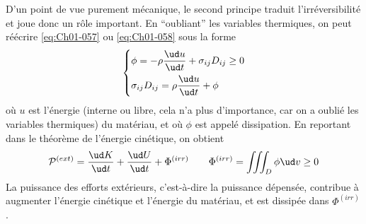 D'un point de vue purement mécanique, le second principe traduit l'irréversibilité et joue donc un rôle important.
En ``oubliant'' les variables thermiques, on peut réécrire \eqref{eq:Ch01-057} ou \eqref{eq:Ch01-058} sous la forme
\begin{equation}
    \left\{
    \begin{aligned}
        & \phi = -\rho \frac{\ud u}{\ud t} + \sigma_{ij} D_{ij} \geq 0\\
        & \sigma_{ij} D_{ij} = \rho \frac{\ud u}{\ud t} + \phi
    \end{aligned}
    \right.
    \label{eq:Ch01-059}
\end{equation}
où $u$ est l'énergie (interne ou libre, cela n'a plus d'importance, car on a oublié les variables thermiques) du matériau, et où $\phi$ est appelé dissipation.
En reportant dans le théorème de l'énergie cinétique, on obtient 
\begin{equation}
    \mathcal{P}^{(ext)} = \frac{\ud K}{\ud t} + \frac{\ud U}{\ud t} + \Phi^{(irr)} \qquad \Phi^{(irr)} = \iiint_{D} \phi \ud v \geq 0
    \label{eq:Ch01-060}
\end{equation}
La puissance des efforts extérieurs, c'est-à-dire la puissance dépensée, contribue à augmenter l'énergie cinétique et l'énergie du matériau, et est dissipée dans $\Phi^{(irr)}$.

